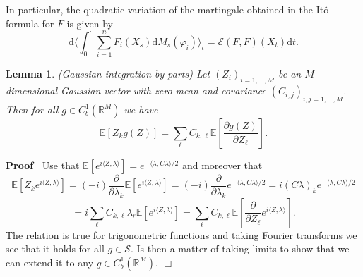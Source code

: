 \documentclass[a4paper,11pt]{article}
\newcommand{\mathd}{\mathrm{d}}
\newenvironment{proof}{\noindent\textbf{Proof\ }}{\hspace*{\fill}$\Box$\medskip}
\newtheorem{lemma}{Lemma}
{\theorembodyfont{\rmfamily}\newtheorem{remark}{Remark}}
\newcommand{\CS}{\mathscr{S}}
\begin{document}
In particular, the quadratic variation of the martingale obtained in the It\^o formula for $F$ is given by
\[
   \mathd \Big\langle \int_0^\cdot \sum_{i = 1}^n F_i (X_s) \mathd M_s (\varphi_i) \Big\rangle_t = \mathcal{E} (F, F) (X_t) \mathd t.
\]
\begin{lemma}
  (Gaussian integration by parts) Let $(Z_i)_{i = 1, \ldots, M}$ be an
  $M$-dimensional Gaussian vector with zero mean and covariance $(C_{i,
  j})_{i, j = 1, \ldots, M}$. Then for all $g \in C^1_b (\mathbb{R}^M)$ we
  have
  \[ \mathbb{E} [Z_k g (Z)] = \sum_{\ell} C_{k, \ell} \mathbb{E} \left[
     \frac{\partial g (Z)}{\partial Z_{\ell}} \right] . \]
\end{lemma}

\begin{proof}
  Use that $\mathbb{E} [e^{i \langle Z, \lambda \rangle}] = e^{- \langle
  \lambda, C \lambda \rangle / 2}$ and moreover that
  \[ \mathbb{E} [Z_k e^{i \langle Z, \lambda \rangle}] = (- i)
     \frac{\partial}{\partial \lambda_k} \mathbb{E} [e^{i \langle Z, \lambda
     \rangle}] = (- i) \frac{\partial}{\partial \lambda_k} e^{- \langle
     \lambda, C \lambda \rangle / 2} = i (C \lambda)_k e^{- \langle \lambda, C
     \lambda \rangle / 2} \]
  \[ = i \sum_{\ell} C_{k, \ell} \lambda_{\ell} \mathbb{E} [e^{i \langle Z,
     \lambda \rangle}] = \sum_{\ell} C_{k, \ell} \mathbb{E}
     [\frac{\partial}{\partial Z_{\ell}} e^{i \langle Z, \lambda \rangle}] .
  \]
  The relation is true for trigonometric functions and taking Fourier
  transforms we see that it holds for all $g \in \CS$. Is then a matter of
  taking limits to show that we can extend it to any $g \in C^1_b
  (\mathbb{R}^M)$.
\end{proof}
\end{document}
